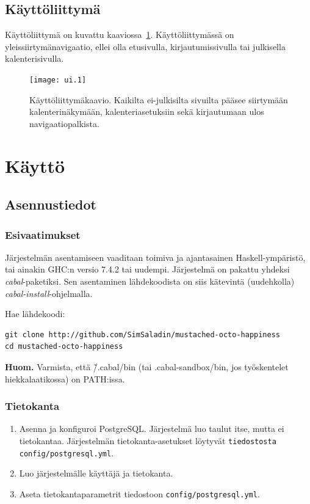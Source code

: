 \documentclass[a4paper,12pt]{report}
\begin{document}
\section{Käyttöliittymä}
Käyttöliittymä on kuvattu kaaviossa~\ref{graph_ui}. Käyttöliittymässä on
yleissiirtymänavigaatio, ellei olla etusivulla, kirjautumissivulla tai
julkisella kalenterisivulla.

\begin{figure}[ht]
   \centering
   \texttt{[image: ui.1]}
   \caption{Käyttöliittymäkaavio. Kaikilta ei-julkisilta sivuilta pääsee
   siirtymään kalenterinäkymään, kalenteriasetuksiin sekä kirjautumaan ulos
   navigaatiopalkista.}
   \label{graph_ui}
\end{figure}

\chapter{Käyttö}
\section{Asennustiedot}

\subsection{Esivaatimukset}

Järjestelmän asentamiseen vaaditaan toimiva ja ajantasainen Haskell-ympäristö,
tai ainakin GHC:n versio 7.4.2 tai uudempi.  Järjestelmä on pakattu yhdeksi
\emph{cabal}-\-paketiksi. Sen asentaminen lähdekoodista on siis kätevintä
(uudehkolla) \emph{cabal-install}-ohjelmalla.

Hae lähdekoodi:
\begin{verbatim}
git clone http://github.com/SimSaladin/mustached-octo-happiness
cd mustached-octo-happiness
\end{verbatim}

\textbf{Huom.} Varmista, että \~/.cabal/bin (tai .cabal-sandbox/bin, jos
työskentelet hiekkalaatikossa) on PATH:issa.

\subsection{Tietokanta}
\begin{enumerate}
   \item Asenna ja konfiguroi PostgreSQL. Järjestelmä luo taulut itse, mutta ei
      tietokantaa. Järjestelmän tietokanta-asetukset löytyvät \texttt{tiedostosta
      config/postgresql.yml}.
   \item Luo järjestelmälle käyttäjä ja tietokanta.
   \item Aseta tietokantaparametrit tiedostoon \texttt{config/postgresql.yml}.
\end{enumerate}
\end{document}
